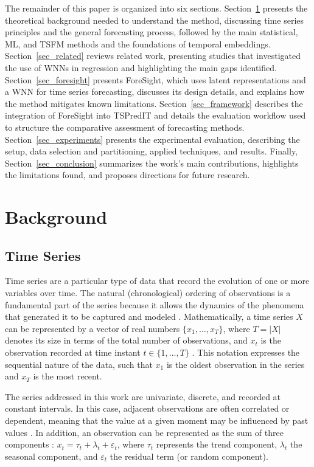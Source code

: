 \documentclass[final,3p,times,twocolumn,authoryear]{elsarticle}
\begin{document}
The remainder of this paper is organized into six sections. Section~\ref{sec_background} presents the theoretical background needed to understand the method, discussing time series principles and the general forecasting process, followed by the main statistical, ML, and TSFM methods and the foundations of temporal embeddings. Section~\ref{sec_related} reviews related work, presenting studies that investigated the use of WNNs in regression and highlighting the main gaps identified. Section~\ref{sec_foresight} presents ForeSight, which uses latent representations and a WNN for time series forecasting, discusses its design details, and explains how the method mitigates known limitations. Section~\ref{sec_framework} describes the integration of ForeSight into TSPredIT and details the evaluation workflow used to structure the comparative assessment of forecasting methods. Section~\ref{sec_experiments} presents the experimental evaluation, describing the setup, data selection and partitioning, applied techniques, and results. Finally, Section~\ref{sec_conclusion} summarizes the work's main contributions, highlights the limitations found, and proposes directions for future research.

\section{Background}
\label{sec_background}

\subsection{Time Series}
\label{sec_timeseries}

Time series are a particular type of data that record the evolution of one or more variables over time. The natural (chronological) ordering of observations is a fundamental part of the series because it allows the dynamics of the phenomena that generated it to be captured and modeled \citep{box_time_2015, kontopoulou_areview_2023}. Mathematically, a time series $X$ can be represented by a vector of real numbers $\{x_1, \dots, x_T\}$, where $T = |X|$ denotes its size in terms of the total number of observations, and $x_t$ is the observation recorded at time instant $t \in \{1, \dots, T\}$ \citep{shumway_time_2017}. This notation expresses the sequential nature of the data, such that $x_1$ is the oldest observation in the series and $x_T$ is the most recent.

The series addressed in this work are univariate, discrete, and recorded at constant intervals. In this case, adjacent observations are often correlated or dependent, meaning that the value at a given moment may be influenced by past values \citep{han_data_2012}. In addition, an observation can be represented as the sum of three components \citep{hyndman_forecasting_2021}: $x_t = \tau_t + \lambda_t + \varepsilon_t$, where $\tau_t$ represents the trend component, $\lambda_t$ the seasonal component, and $\varepsilon_t$ the residual term (or random component).
\end{document}

